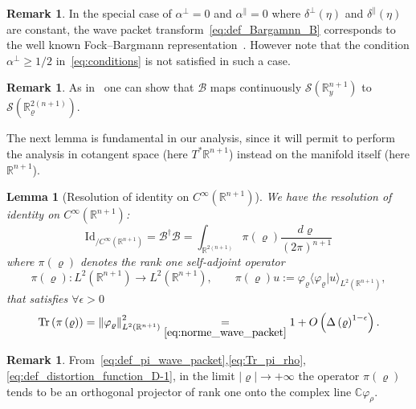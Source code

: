 \documentclass[10pt]{amsart}
\newtheorem{lemm}[theo]{Lemma}\newtheorem{prop}[theo]{Proposition}\newtheorem{coro}[theo]{Corollary}\newtheorem{conj}[theo]{Conjecture}
\theoremstyle{definition}\newtheorem{defi}[theo]{Definition}\newtheorem{rema}[theo]{Remark}\newtheorem{exam}[theo]{Example}\newtheorem{exem}[theo]{Example}\newtheorem{nota}[theo]{Notation}
\newcommand{\clS}{\mathcal{S}}
\newcommand{\clB}{\mathcal{B}}
\newcommand{\Id}{\mathrm{Id}}
\newcommand{\Tr}{\mathrm{Tr}}
\newcommand{\bbR}{\mathbb{R}}
\newcommand{\bbC}{\mathbb{C}}
\let\oldforall\forall
\renewcommand*{\forall}{\mathrel{\oldforall}}
\begin{document}
\begin{rema}
In the special case of $\alpha^{\perp}=0$ and $\alpha^{\parallel}=0$ where $\delta^{\perp}(\eta)$ and $\delta^{\parallel}(\eta)$ are constant, the wave packet transform~\eqref{eq:def_Bargamnn_B} corresponds to the well known Fock--Bargmann representation~\cite[Chap.1]{folland-88}. However note that the condition $\alpha^{\perp}\geq1/2$ in~\eqref{eq:conditions} is not satisfied in such a case.
\end{rema}


\begin{rema}\label{rem:As-in-}
As in~\cite[Prop.~3.1.6, p.~76]{martinez-01} one can show that $\clB$ maps continuously $\clS(\bbR_{y}^{n+1})$ to $\clS(\bbR_{\varrho}^{2(n+1)})$.
\end{rema}

The next lemma is fundamental in our analysis, since it will permit to perform the analysis in cotangent space (here $T^{*}\bbR^{n+1}$) instead on the manifold itself (here $\bbR^{n+1}$).

\begin{cBoxB}{}
\begin{lemm}[Resolution of identity on $C^{\infty}(\bbR^{n+1})$]\label{lem:Wave_packets}
We have the resolution of identity on $C^{\infty}(\bbR^{n+1})$:
\begin{equation}\label{eq:resol_identity_B}
\Id _{/C^{\infty}\left(\bbR^{n+1}\right)}=\clB^{\dagger}\clB=\int_{\bbR^{2\left(n+1\right)}}\pi\left(\varrho\right)\frac{d\varrho}{\left(2\pi\right)^{n+1}}
\end{equation}
where $\pi(\varrho)$ denotes the rank one self-adjoint operator
\begin{equation}\label{eq:def_pi_wave_packet}
\pi\left(\varrho\right):L^{2}\left(\bbR^{n+1}\right)\rightarrow L^{2}\left(\bbR^{n+1}\right),\quad\quad\pi\left(\varrho\right)u:=\varphi_{\varrho}\langle\varphi_{\varrho}|u\rangle_{L^{2}\left(\bbR^{n+1}\right)},
\end{equation}
that satisfies $\forall\epsilon>0$
\begin{equation}\label{eq:Tr_pi_rho}
\Tr\left(\pi\left(\varrho\right)\right)=\left\Vert \varphi_{\varrho}\right\Vert _{L^{2}\left(\bbR^{n+1}\right)}^{2}\underset{\eqref{eq:norme_wave_packet}}{=}1+O\left(\Delta\left(\varrho\right)^{1-\epsilon}\right).
\end{equation}
\end{lemm}
\end{cBoxB}

\begin{rema}
From~\eqref{eq:def_pi_wave_packet},\eqref{eq:Tr_pi_rho},\eqref{eq:def_distortion_function_D-1}, in the limit $|\varrho|\rightarrow+\infty$ the operator $\pi(\varrho)$ tends to be an orthogonal projector of rank one onto the complex line $\bbC\varphi_{\rho}$.
\end{rema}
\end{document}
